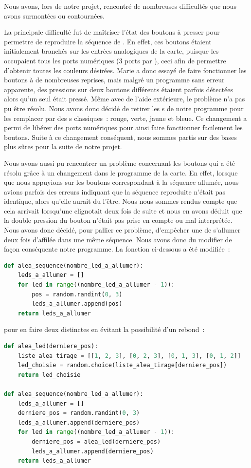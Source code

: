 \documentclass[a4paper, 11pt]{article}
\newcommand{\led}{\sc{led}}
\newcommand{\rvb}{\sc{rvb}}
\begin{document}
Nous avons, lors de notre projet, rencontré de nombreuses difficultés que nous avons surmontées ou contournées.

La principale difficulté fut de maîtriser l'état des boutons à presser pour permettre de reproduire la séquence de \led{}. En effet, ces boutons étaient initialement branchés sur les entrées analogiques de la carte, puisque les \led{} \rvb{} occupaient tous les ports numériques (3 ports par \led{}), ceci afin de permettre d'obtenir toutes les couleurs désirées. Marie a donc essayé de faire fonctionner les boutons à de nombreuses reprises, mais malgré un programme sans erreur apparente, des pressions sur deux boutons différents étaient parfois détectées alors qu'un seul était pressé. Même avec de l'aide extérieure, le problème n'a pas pu être résolu. Nous avons donc décidé de retirer les \led{}s \rvb{} de notre programme pour les remplacer par des \led{}s classiques : rouge, verte, jaune et bleue. Ce changement a permi de libérer des ports numériques pour ainsi faire fonctionner facilement les boutons. Suite à ce changement conséquent, nous sommes partis sur des bases plus sûres pour la suite de notre projet.

Nous avons aussi pu rencontrer un problème concernant les boutons qui a été résolu grâce à un changement dans le programme de la carte. En effet, lorsque que nous appuyions sur les boutons correspondant à la séquence allumée, nous avions parfois des erreurs indiquant que la séquence reproduite n'était pas identique, alors qu'elle aurait du l'être. Nous nous sommes rendus compte que cela arrivait lorsqu'une \led{} clignotait deux fois de suite et nous en avons déduit que la double pression du bouton n'était pas prise en compte ou mal interprétée. Nous avons donc décidé, pour pallier ce problème, d'empêcher une \led{} de s'allumer deux fois d'affilée dans une même séquence. Nous avons donc du modifier de façon conséquente notre programme. La fonction ci-dessous a été modifiée~:

\begin{lstlisting}[language=Python, float=H, caption=Fonction \tt{alea\_sequence} (avant)]
def alea_sequence(nombre_led_a_allumer):
    leds_a_allumer = []
    for led in range((nombre_led_a_allumer - 1)):
        pos = random.randint(0, 3)
        leds_a_allumer.append(pos)
    return leds_a_allumer
\end{lstlisting}

pour en faire deux distinctes en évitant la possibilité d'un rebond~:

\begin{lstlisting}[language=Python, float=H, caption=Fonctions \tt{alea\_led} et \tt{alea\_sequence} (après)]
def alea_led(derniere_pos):
    liste_alea_tirage = [[1, 2, 3], [0, 2, 3], [0, 1, 3], [0, 1, 2]]
    led_choisie = random.choice(liste_alea_tirage[derniere_pos])
    return led_choisie

def alea_sequence(nombre_led_a_allumer):
    leds_a_allumer = []
    derniere_pos = random.randint(0, 3)
    leds_a_allumer.append(derniere_pos)
    for led in range((nombre_led_a_allumer - 1)):
        derniere_pos = alea_led(derniere_pos)
        leds_a_allumer.append(derniere_pos)
    return leds_a_allumer
\end{lstlisting}
\end{document}
